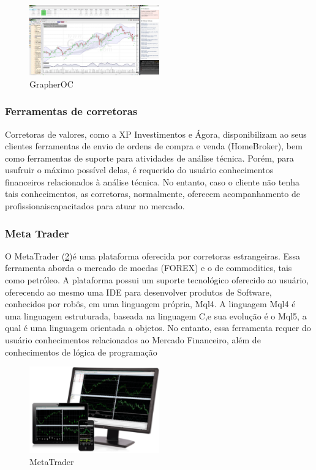 \begin{figure}[h]
\centering
\label{f03}
\includegraphics[width=0.5\textwidth]{figuras/f03}
\caption{GrapherOC}

\end{figure}

\subsubsection{Ferramentas de corretoras}

Corretoras de valores, como a XP Investimentos e Ágora, disponibilizam ao seus clientes ferramentas de envio de ordens de compra e venda (HomeBroker), bem como ferramentas de suporte para atividades de análise técnica. Porém, para usufruir o máximo possível delas, é requerido do usuário conhecimentos financeiros relacionados à análise técnica. No entanto, caso o cliente não tenha tais conhecimentos, as corretoras, normalmente, oferecem acompanhamento de profissionaiscapacitados para atuar no mercado.

\subsubsection{Meta Trader}

O MetaTrader (\ref{f04})é uma plataforma oferecida por corretoras estrangeiras. Essa ferramenta aborda o mercado de moedas (FOREX) e o de commodities, tais como petróleo. A plataforma possui um suporte tecnológico oferecido ao usuário, oferecendo ao mesmo uma IDE para desenvolver produtos de Software, conhecidos por robôs, em uma linguagem própria, Mql4. A linguagem Mql4 é uma linguagem estruturada, baseada na linguagem C,e sua evolução é o Mql5, a qual é uma linguagem orientada a objetos. No entanto, essa ferramenta requer do usuário conhecimentos relacionados ao Mercado Financeiro, além de conhecimentos de lógica de programação

\begin{figure}[h]
\centering
\label{f04}
\includegraphics[width=0.5\textwidth]{figuras/f04}
\caption{MetaTrader}

\end{figure}


